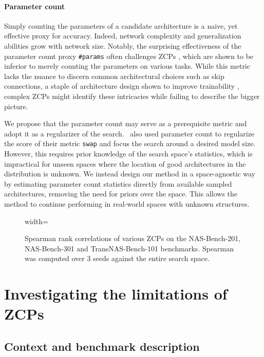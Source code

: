 \documentclass[10pt]{article} %
\begin{document}
\paragraph{Parameter count} Simply counting the parameters of a candidate architecture is a naive, yet effective proxy for accuracy. Indeed, network complexity and generalization abilities grow with network size. Notably, the surprising effectiveness of the parameter count proxy \texttt{\#params} often challenges ZCPs \citep{colin2022adeeperlook, javaheripi2022litetransformersearch}, which are shown to be inferior to merely counting the parameters on various tasks. While this metric lacks the nuance to discern common architectural choices such as skip connections, a staple of architecture design shown to improve trainability \citep{he2015deep, orhan2017skip}, complex ZCPs might identify these intricacies while failing to describe the bigger picture.

We propose that the parameter count may serve as a prerequisite metric and adopt it as a regularizer of the search.~\citet{peng2024swap} also used parameter count to regularize the score of their metric \texttt{swap} and focus the search around a desired model size. However, this requires prior knowledge of the search space's statistics, which is impractical for unseen spaces where the location of good architectures in the distribution is unknown. We instead design our method in a space-agnostic way by estimating parameter count statistics directly from available sampled architectures, removing the need for priors over the space. This allows the method to continue performing in real-world spaces with unknown structures.

\begin{figure}[t]
\begin{adjustbox}{width=\linewidth}
    
\end{adjustbox}
\caption{\centering Spearman rank correlations of various ZCPs on the NAS-Bench-201, NAS-Bench-301 and TransNAS-Bench-101 benchmarks. Spearman was computed over 3 seeds against the entire search space.}
\label{fig_bench_corr_full}
\end{figure}

\section{Investigating the limitations of ZCPs}
\label{investigation}

\subsection{Context and benchmark description}
\label{investigation_context}
\end{document}
